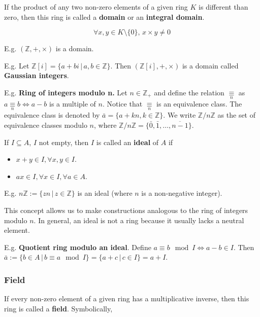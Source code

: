 \documentclass[
]{article}
\begin{document}
If the product of any two non-zero elements of a given ring \(K\) is
different than zero, then this ring is called a \textbf{domain} or an
\textbf{integral domain}.

\[\forall x, y \in K \setminus \{ 0 \}, \, x \times y \neq 0\]

E.g. \((\mathbb{Z}, +, \times)\) is a domain.

E.g. Let \(\mathbb{Z}[i] = \{ a+ bi \, |  \, a,b \in \mathbb{Z} \}\).
Then \((\mathbb{Z}[i], +, \times)\) is a domain called \textbf{Gaussian
integers}.

E.g. \textbf{Ring of integers modulo n.} Let \(n \in \mathbb{Z}_+\) and
define the relation \(\underset{n}{\equiv}\) as
\(a \underset{n}{\equiv} b \iff a - b\) is a multiple of \(n\). Notice
that \(\underset{n}{\equiv}\) is an equivalence class. The equivalence
class is denoted by \(\bar{a} = \{ a+kn, k \in \mathbb{Z} \}\). We write
\(\mathbb{Z}/n \mathbb{Z}\) as the set of equivalence classes modulo
\(n\), where
\(\mathbb{Z}/n \mathbb{Z} = \{ \bar{0}, \bar{1}, \ldots, \overline{n-1} \}\).

If \(I \subseteq A\), \(I\) not empty, then \(I\) is called an
\textbf{ideal} of \(A\) if

\begin{itemize}
\item
  \(x+y \in I, \forall x, y \in I\).
\item
  \(ax \in I, \forall x \in I, \forall a \in A\).
\end{itemize}

E.g. \(n \mathbb{Z} := \{zn \, | \, z \in \mathbb{Z} \}\) is an ideal
(where \(n\) is a non-negative integer).

This concept allows us to make constructions analogous to the ring of
integers modulo \(n\). In general, an ideal is not a ring because it
usually lacks a neutral element.

E.g. \textbf{Quotient ring modulo an ideal}. Define
\(a \equiv b \mod I \iff a- b \in I\). Then
\(\bar{a} := \{ b \in A \, | \, b \equiv a \mod I \} = \{ a + c \, | \, c \in I \} = a + I\).

\hypertarget{field}{%
\subsubsection{Field}\label{field}}

If every non-zero element of a given ring has a multiplicative inverse,
then this ring is called a \textbf{field}. Symbolically,
\end{document}
